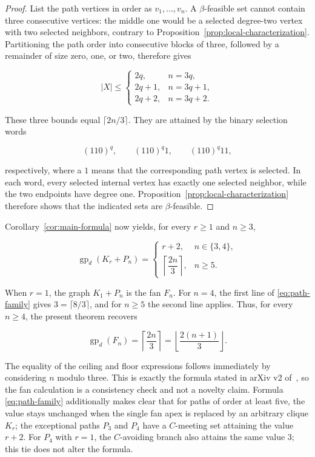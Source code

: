 \documentclass[11pt,a4paper]{article}
\numberwithin{equation}{section}
\begin{document}
\begin{proof}
List the path vertices in order as \(v_1,\ldots,v_n\). A
\(\beta\)-feasible set cannot contain three consecutive vertices: the
middle one would be a selected degree-two vertex with two selected
neighbors, contrary to Proposition~\ref{prop:local-characterization}. Partitioning the path order into
consecutive blocks of three, followed by a remainder of size zero, one,
or two, therefore gives

\[
|X|\le
\begin{cases}
2q,&n=3q,\\
2q+1,&n=3q+1,\\
2q+2,&n=3q+2.
\end{cases}
\]

These three bounds equal \(\lceil 2n/3\rceil\). They are attained by the
binary selection words

\[
(110)^q,\qquad (110)^q1,\qquad (110)^q11,
\]

respectively, where a \(1\) means that the corresponding path vertex is
selected. In each word, every selected internal vertex has exactly one
selected neighbor, while the two endpoints have degree one.
Proposition~\ref{prop:local-characterization} therefore shows that the
indicated sets are \(\beta\)-feasible.
\end{proof}

Corollary~\ref{cor:main-formula} now yields, for every \(r\ge 1\) and \(n\ge 3\),

\begin{equation}\label{eq:path-family}
\operatorname{gp}_d(K_r+P_n)=
\begin{cases}
r+2,&n\in\{3,4\},\\
\left\lceil\dfrac{2n}{3}\right\rceil,&n\ge 5.
\end{cases}
\end{equation}

When \(r=1\), the graph \(K_1+P_n\) is the fan \(F_n\). For \(n=4\), the
first line of \eqref{eq:path-family} gives \(3=\lceil 8/3\rceil\), and for \(n\ge 5\) the
second line applies. Thus, for every \(n\ge 4\), the present theorem
recovers

\[
\operatorname{gp}_d(F_n)
=\left\lceil\frac{2n}{3}\right\rceil
=\left\lfloor\frac{2(n+1)}{3}\right\rfloor.
\]

The equality of the ceiling and floor expressions follows immediately by
considering \(n\) modulo three. This is exactly the formula stated in arXiv
v2 of~\cite{tian-et-al-removal}, so the fan calculation is a consistency
check and not a novelty claim. Formula \eqref{eq:path-family} additionally makes clear
that for paths of order at least five, the value stays unchanged when
the single fan apex is replaced by an arbitrary clique \(K_r\); the
exceptional paths \(P_3\) and \(P_4\) have a \(C\)-meeting set attaining
the value \(r+2\). For \(P_4\) with \(r=1\), the \(C\)-avoiding branch
also attains the same value \(3\); this tie does not alter the formula.
\end{document}
